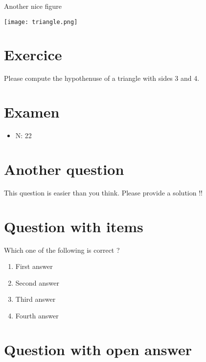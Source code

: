\documentclass[a4paper,11pt,twoside]{article}
\begin{document}
Another nice figure

\begin{center}
\texttt{[image: triangle.png]}
\end{center}



\section*{Exercice}
\label{sec:orga251144}

Please compute the hypothenuse of a triangle with sides 3 and 4.



\subsection*{}
\label{sec:org11524c5}

\cleardoublepage

\section*{Examen}
\label{sec:orgffb8b6b}
\begin{itemize}
\item N: 22
\end{itemize}
\section*{Another question}
\label{sec:orga7623ee}

This question is easier than you think. Please provide a solution !!



\section*{Question with items}
\label{sec:org45579ff}

Which one of the following is correct ?

\begin{enumerate}
\item First answer
\item Second answer
\item Third answer
\item Fourth answer
\end{enumerate}



\section*{Question with open answer}
\label{sec:org067ef80}
\end{document}
